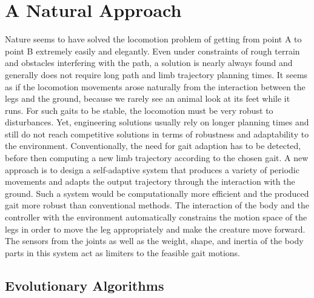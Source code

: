 \documentclass[main]{subfiles}
\begin{document}
\section{A Natural Approach}

Nature seems to have solved the locomotion problem of getting from point A to point B extremely easily and elegantly. %
%
Even under constraints of rough terrain and obstacles interfering with the path, a solution is nearly always found and generally does not require long path and limb trajectory planning times. %
%
It seems as if the locomotion movements arose naturally from the interaction between the legs and the ground, because we rarely see an animal look at its feet while it runs. %
%
For such gaits to be stable, the locomotion must be very robust to disturbances. %
%
Yet, engineering solutions usually rely on longer planning times and still do not reach competitive solutions in terms of robustness and adaptability to the environment. %
%
Conventionally, the need for gait adaption has to be detected, before then computing a new limb trajectory according to the chosen gait. %
%
A new approach is to design a self-adaptive system that produces a variety of periodic movements and adapts the output trajectory through the interaction with the ground. %
%
Such a system would be computationally more efficient and the produced gait more robust than conventional methods. %
%
The interaction of the body and the controller with the environment automatically constrains the motion space of the legs in order to move the leg appropriately and make the creature move forward. %
%
The sensors from the joints as well as the weight, shape, and inertia of the body parts in this system act as limiters to the feasible gait motions.

\subsection{Evolutionary Algorithms}
\end{document}
